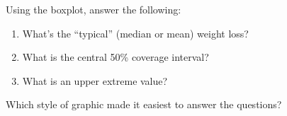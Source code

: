 

Using the boxplot, answer the following:
\begin{enumerate}
\item What's the ``typical'' (median or mean) weight loss?\\
\item What is the central 50\% coverage interval?\\
\item What is an upper extreme value?
\end{enumerate}

\bigskip

Which style of graphic made it easiest to answer the questions?\\

